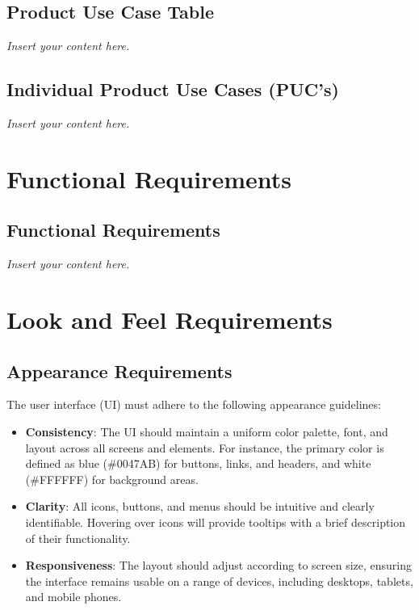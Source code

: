 \documentclass[12pt]{article}
\newcommand{\lips}{\textit{Insert your content here.}}
\begin{document}
\subsection{Product Use Case Table}
\lips
\subsection{Individual Product Use Cases (PUC's)}
\lips

\section{Functional Requirements}
\subsection{Functional Requirements}
\lips

\section{Look and Feel Requirements}

\subsection{Appearance Requirements}
The user interface (UI) must adhere to the following appearance guidelines:
\begin{itemize}
    \item \textbf{Consistency}: The UI should maintain a uniform color palette, 
    font, and layout across all screens and elements. For instance, the primary 
    color is defined as blue (\#0047AB) for buttons, links, and headers, and 
    white (\#FFFFFF) for background areas.
    
    \item \textbf{Clarity}: All icons, buttons, and menus should be intuitive and 
    clearly identifiable. Hovering over icons will provide tooltips with a brief 
    description of their functionality.
    
    \item \textbf{Responsiveness}: The layout should adjust according to screen 
    size, ensuring the interface remains usable on a range of devices, including 
    desktops, tablets, and mobile phones.
\end{itemize}
\end{document}
